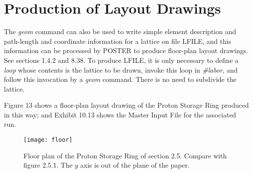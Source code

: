 \newpage
\section{Production of Layout Drawings}
\label{prodlayout}
The {\em geom} command can also be used to write simple element
description and path-length and coordinate information for a lattice on
file LFILE, and this information can be processed by POSTER to produce
floor-plan layout drawings.  See sections 1.4.2 and 8.38.  To produce
LFILE, it is only necessary to define a {\em loop} whose contents is the
lattice to be drawn, invoke this loop in {\em \#labor}, and follow this
invocation by a {\em geom} command.  There is no need to subdivide the
lattice.  

Figure 13 shows a floor-plan layout drawing of the Proton Storage Ring
produced in this way; and Exhibit 10.13 shows the Master Input File for
the associated \Mary run.

\newpage
\renewcommand{\thefigure}{\thesection.{\arabic{figure}}}
\begin{figure}[htp]
  \centering
  \texttt{[image: floor]}
  \caption{Floor plan of the Proton Storage Ring of section 2.5.  Compare
    with figure 2.5.1.  The $y$ axis is out of the plane of the paper.}
\end{figure}

